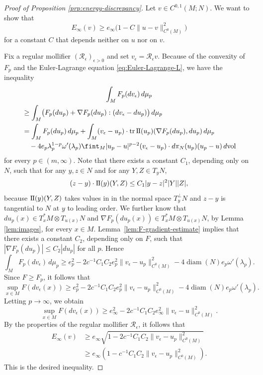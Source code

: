 \documentclass[a4paper]{article}
\newcommand{\vol}{\mathrm{vol}}
\newcommand{\sff}{\mathrm{I{\mkern -1mu}I}}
\DeclareMathOperator{\tr}{tr}
\DeclareMathOperator{\diam}{diam}
\theoremstyle{definition}
\theoremstyle{remark}
\begin{document}
\begin{proof}[Proof of Proposition \ref{prp:energy-discrepancy}]
Let $v \in C^{0, 1}(M; N)$. We want to show that
\[
E_\infty(v) \ge e_\infty\bigl(1 - C\|u - v\|_{C^0(M)}^2\bigr)
\]
for a constant $C$ that depends neither on $u$ nor on $v$.

Fix a regular mollifier $(\mathcal{R}_\epsilon)_{\epsilon > 0}$ and set $v_\epsilon = \mathcal{R}_\epsilon v$.
Because of the convexity of $F_p$ and the Euler-Lagrange equation \eqref{eq:Euler-Lagrange-L},
we have the inequality
\begin{multline*}
\int_M F_p(dv_\epsilon) \, d\mu_p \\
\begin{aligned}
& \ge \int_M \bigl(F_p(du_p) + \nabla F_p(du_p) : (dv_\epsilon - du_p)\bigr) \, d\mu_p \\
& = \int_M F_p(du_p) \, d\mu_p + \int_M (v_\epsilon - u_p) \cdot \tr \sff(u_p)(\nabla F_p(du_p), du_p) \, d\mu_p \\
& \quad - 4 e_p \lambda_p^{1 - p} \omega'(\lambda_p) \fint_M |u_p - u|^{p - 2} (v_\epsilon - u_p) \cdot d\pi_N(u_p)(u_p - u) \, d\vol
\end{aligned}
\end{multline*}
for every $p \in (m, \infty)$. Note that there exists a constant $C_1$, depending only on $N$,
such that for any $y, z \in N$ and for any $Y, Z \in T_yN$,
\[
(z - y) \cdot \sff(y)(Y, Z) \le C_1 |y - z|^2 |Y| |Z|,
\]
because $\sff(y)(Y, Z)$ takes values in in the normal space $T_y^\perp N$ and
$z - y$ is tangential to $N$ at $y$ to leading order. We further know that
$du_p(x) \in T_x^*M \otimes T_{u(x)} N$ and $\nabla F_p(du_p(x)) \in T_x^*M \otimes T_{u(x)} N$,
by Lemma \ref{lem:images}, for every $x \in M$. Lemma~\ref{lem:F-gradient-estimate} implies that
there exists a constant $C_2$, depending only on $F$, such that $|\nabla F_p(du_p)| \le C_2|du_p|$
for all $p$. Hence
\[
\int_M F_p(dv_\epsilon) \, d\mu_p \ge e_p^2 - 2c^{-1} C_1C_2 e_p^2 \|v_\epsilon - u_p\|_{C^0(M)}^2 - 4\diam(N) e_p \omega'(\lambda_p).
\]
Since $F \ge F_p$, it follows that
\[
\sup_{x \in M} F(dv_\epsilon(x)) \ge e_p^2 - 2c^{-1} C_1C_2 e_p^2 \|v_\epsilon - u_p\|_{C^0(M)}^2 - 4\diam(N) e_p \omega'(\lambda_p).
\]
Letting $p \to \infty$, we obtain
\[
\sup_{x \in M} F(dv_\epsilon(x)) \ge e_\infty^2 - 2c^{-1} C_1C_2 e_\infty^2 \|v_\epsilon - u\|_{C^0(M)}^2.
\]
By the properties of the regular mollifier $\mathcal{R}_\epsilon$, it follows that
\[
\begin{split}
E_\infty(v) & \ge e_\infty \sqrt{1 - 2c^{-1} C_1C_2 \|v_\epsilon - u_p\|_{C^0(M)}^2} \\
& \ge e_\infty \left(1 - c^{-1} C_1C_2 \|v_\epsilon - u_p\|_{C^0(M)}^2\right).
\end{split}
\]
This is the desired inequality.
\end{proof}
\end{document}

